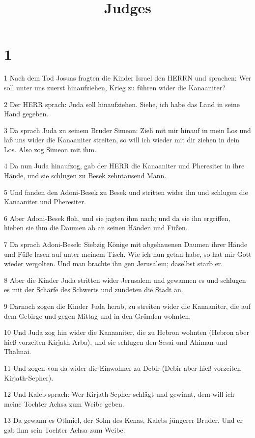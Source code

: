

\title{Judges}


\chapter{1}

\par 1 Nach dem Tod Josuas fragten die Kinder Israel den HERRN und sprachen: Wer soll unter uns zuerst hinaufziehen, Krieg zu führen wider die Kanaaniter?
\par 2 Der HERR sprach: Juda soll hinaufziehen. Siehe, ich habe das Land in seine Hand gegeben.
\par 3 Da sprach Juda zu seinem Bruder Simeon: Zieh mit mir hinauf in mein Los und laß uns wider die Kanaaniter streiten, so will ich wieder mit dir ziehen in dein Los. Also zog Simeon mit ihm.
\par 4 Da nun Juda hinaufzog, gab der HERR die Kanaaniter und Pheresiter in ihre Hände, und sie schlugen zu Besek zehntausend Mann.
\par 5 Und fanden den Adoni-Besek zu Besek und stritten wider ihn und schlugen die Kanaaniter und Pheresiter.
\par 6 Aber Adoni-Besek floh, und sie jagten ihm nach; und da sie ihn ergriffen, hieben sie ihm die Daumen ab an seinen Händen und Füßen.
\par 7 Da sprach Adoni-Besek: Siebzig Könige mit abgehauenen Daumen ihrer Hände und Füße lasen auf unter meinem Tisch. Wie ich nun getan habe, so hat mir Gott wieder vergolten. Und man brachte ihn gen Jerusalem; daselbst starb er.
\par 8 Aber die Kinder Juda stritten wider Jerusalem und gewannen es und schlugen es mit der Schärfe des Schwerts und zündeten die Stadt an.
\par 9 Darnach zogen die Kinder Juda herab, zu streiten wider die Kanaaniter, die auf dem Gebirge und gegen Mittag und in den Gründen wohnten.
\par 10 Und Juda zog hin wider die Kanaaniter, die zu Hebron wohnten (Hebron aber hieß vorzeiten Kirjath-Arba), und sie schlugen den Sesai und Ahiman und Thalmai.
\par 11 Und zogen von da wider die Einwohner zu Debir (Debir aber hieß vorzeiten Kirjath-Sepher).
\par 12 Und Kaleb sprach: Wer Kirjath-Sepher schlägt und gewinnt, dem will ich meine Tochter Achsa zum Weibe geben.
\par 13 Da gewann es Othniel, der Sohn des Kenas, Kalebs jüngerer Bruder. Und er gab ihm sein Tochter Achsa zum Weibe.
